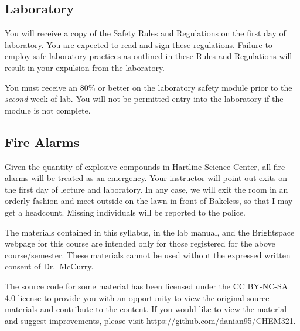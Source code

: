 \documentclass[11pt,letterpaper]{article}
\begin{document}
\subsection{Laboratory}
You will receive a copy of the Safety Rules and Regulations on the first day of
laboratory. You are expected to read and sign these regulations. Failure to
employ safe laboratory practices as outlined in these Rules and Regulations will
result in your expulsion from the laboratory.

You must receive an 80\% or better on the laboratory safety module prior to the
\emph{second} week of lab. You will not be permitted entry into the laboratory
if the module is not complete.

\subsection{Fire Alarms}
Given the quantity of explosive compounds in Hartline Science Center, all fire
alarms will be treated as an emergency. Your instructor will point out exits on
the first day of lecture and laboratory. In any case, we will exit the room in
an orderly fashion and meet outside on the lawn in front of Bakeless, so that I
may get a headcount. Missing individuals will be reported to the police.

\vfill

\begin{mdframed}
	\noindent
	The materials contained in this syllabus, in the lab manual, and the
	Brightspace webpage for this course are intended only for those registered for
	the above course/semester. These materials cannot be used without the
	expressed written consent of Dr.\ McCurry.

	\bigskip

	\noindent
	The source code for some material has been licensed under the CC
	BY-NC-SA 4.0 license to provide you with an opportunity to view the
	original source materials and contribute to the content. If you would
	like to view the material and suggest improvements, please visit
	\url{https://github.com/danian95/CHEM321}.
\end{mdframed}
\end{document}
